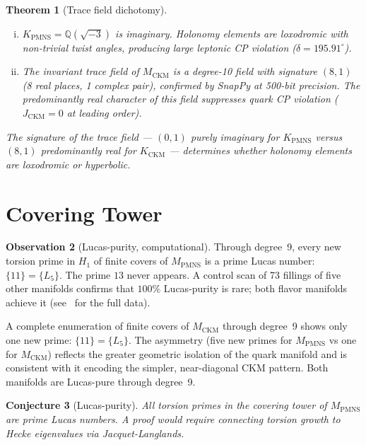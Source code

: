 \documentclass[11pt,a4paper]{article}
\newtheorem{theorem}{Theorem}
\newtheorem{conjecture}[theorem]{Conjecture}
\theoremstyle{definition}
\newtheorem{observation}[theorem]{Observation}
\newcommand{\MPMNS}{M_{\mathrm{PMNS}}}
\newcommand{\KPMNS}{K_{\mathrm{PMNS}}}
\begin{document}
\begin{theorem}[Trace field dichotomy]
\label{thm:dichotomy}
\begin{enumerate}[(i)]
\item $\KPMNS=\mathbb{Q}(\sqrt{-3})$ is imaginary.
  Holonomy elements are loxodromic with non-trivial twist angles,
  producing large leptonic CP violation ($\delta=195.91^\circ$).
\item The invariant trace field of $M_{\mathrm{CKM}}$
  is a degree-10 field with signature $(8,1)$ (8 real places,
  1 complex pair), confirmed by SnapPy at 500-bit precision.
  The predominantly real character of this field suppresses
  quark CP violation ($J_{\mathrm{CKM}}=0$ at leading order).
\end{enumerate}
The signature of the trace field — $(0,1)$ purely imaginary
for $\KPMNS$ versus $(8,1)$ predominantly real for $K_{\mathrm{CKM}}$
— determines whether holonomy elements are loxodromic or hyperbolic.
\end{theorem}

\section{Covering Tower}
\label{sec:covering}

\begin{observation}[Lucas-purity, computational]
Through degree~9, every new torsion prime in $H_1$ of finite covers
of $\MPMNS$ is a prime Lucas number:
$\{11\}=\{L_5\}$.
The prime $13$ never appears.
A control scan of 73 fillings of five other manifolds confirms that
$100\%$ Lucas-purity is rare; both flavor manifolds achieve it
(see~\cite{Gentry:Covering} for the full data).

A complete enumeration of finite covers of $M_{\mathrm{CKM}}$ through
degree~9 shows only one new prime: $\{11\}=\{L_5\}$.
The asymmetry (five new primes for $\MPMNS$ vs one for $M_{\mathrm{CKM}}$)
reflects the greater geometric isolation of the quark manifold and
is consistent with it encoding the simpler, near-diagonal CKM pattern.
Both manifolds are Lucas-pure through degree~9.
\end{observation}

\begin{conjecture}[Lucas-purity]
All torsion primes in the covering tower of $\MPMNS$ are prime
Lucas numbers. A proof would require connecting torsion growth to
Hecke eigenvalues via Jacquet-Langlands.
\end{conjecture}
\end{document}
